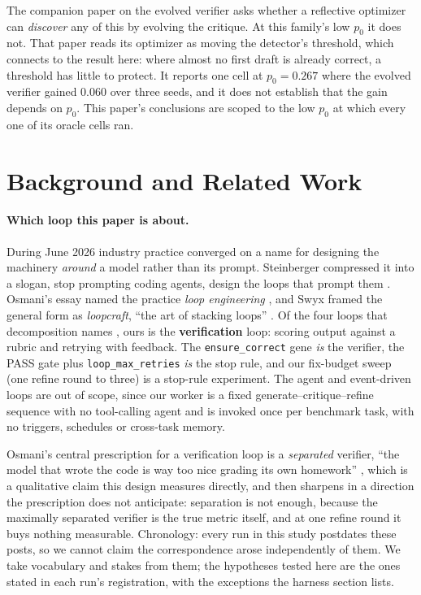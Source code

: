 \documentclass[11pt]{article}
\begin{document}
The companion paper on the evolved verifier asks whether a reflective optimizer can
\emph{discover} any of this by evolving
the critique. At this family's low $p_0$ it does not. That paper reads its optimizer as moving the
detector's threshold, which connects to the result here: where almost no first draft is already
correct, a threshold has little to protect. It reports one cell at $p_0 = 0.267$ where the
evolved verifier gained $0.060$ over three seeds, and it does not establish that the gain depends
on $p_0$. This paper's conclusions are scoped to the low $p_0$ at which every one of its oracle
cells ran.

\section{Background and Related Work}
\label{sec:related}

\paragraph{Which loop this paper is about.}
During June 2026 industry practice converged on a name for designing the machinery
\emph{around} a model rather than its prompt. Steinberger compressed it into a slogan,
stop prompting coding agents, design the loops that prompt them
\citep{steinberger2026loops}. Osmani's essay named the practice \emph{loop engineering}
\citep{osmani2026loop}, and Swyx framed the general form as \emph{loopcraft}, ``the art of
stacking loops'' \citep{swyx2026loopcraft}. Of the four loops that decomposition names
\citep{langchain2026loopcraft}, ours is the \textbf{verification} loop: scoring output against a
rubric and retrying with feedback. The \texttt{ensure\_correct} gene \emph{is} the verifier, the
PASS gate plus \texttt{loop\_max\_retries} \emph{is} the stop rule, and our fix-budget sweep
(one refine round to three) is a stop-rule experiment. The agent and event-driven loops are out of scope,
since our worker is a fixed generate--critique--refine sequence with no tool-calling agent and is
invoked once per benchmark task, with no triggers, schedules or cross-task memory.

Osmani's central prescription for a verification loop is a \emph{separated} verifier, ``the
model that wrote the code is way too nice grading its own homework''
\citep{osmani2026loop}, which is a qualitative claim this design measures directly, and then
sharpens in a direction the prescription does not anticipate: separation is not enough, because the
maximally separated verifier is the true metric itself, and at one refine round it buys nothing
measurable.
Chronology: every run in this study postdates these posts, so we cannot claim the
correspondence arose independently of them. We take vocabulary and stakes from them; the
hypotheses tested here are the ones stated in each run's registration, with the exceptions the
harness section lists.
\end{document}
